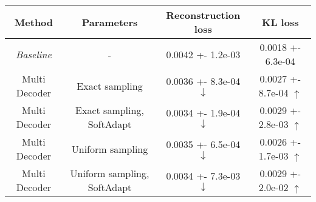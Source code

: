 \centering
\scriptsize
\begin{tabular}{||c|c|c|c||}
\hline
 Method & Parameters & Reconstruction loss & KL loss \\
\hline
\textit{Baseline} & - & 0.0042 +- 1.2e-03 & 0.0018 +- 6.3e-04 \\
\hline
Multi Decoder & Exact sampling & 0.0036 +- 8.3e-04  $\downarrow$ & 0.0027 +- 8.7e-04  $\uparrow$ \\
\hline
Multi Decoder & Exact sampling, SoftAdapt & 0.0034 +- 1.9e-04  $\downarrow$ & 0.0029 +- 2.8e-03  $\uparrow$ \\
\hline
Multi Decoder & Uniform sampling & 0.0035 +- 6.5e-04  $\downarrow$ & 0.0026 +- 1.7e-03  $\uparrow$ \\
\hline
Multi Decoder & Uniform sampling, SoftAdapt & 0.0034 +- 7.3e-03  $\downarrow$ & 0.0029 +- 2.0e-02  $\uparrow$ \\
\hline
\end{tabular}
